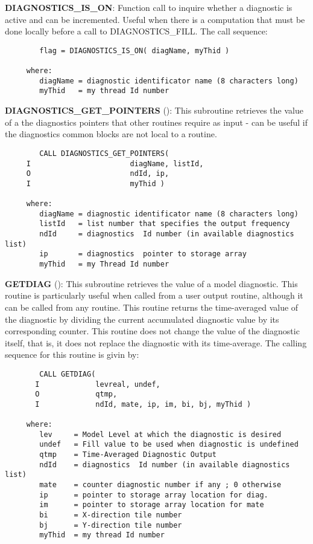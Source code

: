 \noindent
{\bf DIAGNOSTICS\_IS\_ON}: Function call to inquire whether a
diagnostic is active and can be incremented. Useful when there is a
computation that must be done locally before a call to
DIAGNOSTICS\_FILL. The call sequence:

\begin{verbatim}
        flag = DIAGNOSTICS_IS_ON( diagName, myThid )

     where:
        diagName = diagnostic identificator name (8 characters long)
        myThid   = my thread Id number
\end{verbatim}

\noindent
{\bf DIAGNOSTICS\_GET\_POINTERS}
():
This subroutine retrieves the value of a the diagnostics pointers 
that other routines require as input - can be useful if the diagnostics common 
blocks are not local to a routine.

\begin{verbatim}
        CALL DIAGNOSTICS_GET_POINTERS(
     I                       diagName, listId,
     O                       ndId, ip,
     I                       myThid )

     where:
        diagName = diagnostic identificator name (8 characters long)
        listId   = list number that specifies the output frequency
        ndId     = diagnostics  Id number (in available diagnostics list)
        ip       = diagnostics  pointer to storage array
        myThid   = my Thread Id number
\end{verbatim}

\noindent
{\bf GETDIAG} 
():
This subroutine retrieves the value of a model diagnostic.  
This routine is particularly useful when called from a
user output routine, although it can be called from any routine.  This
routine returns the time-averaged value of the diagnostic by dividing
the current accumulated diagnostic value by its corresponding counter.
This routine does not change the value of the diagnostic itself, that
is, it does not replace the diagnostic with its time-average.  The
calling sequence for this routine is givin by:

\begin{verbatim}
        CALL GETDIAG(
       I             levreal, undef,
       O             qtmp,
       I             ndId, mate, ip, im, bi, bj, myThid )

     where:
        lev     = Model Level at which the diagnostic is desired
        undef   = Fill value to be used when diagnostic is undefined
        qtmp    = Time-Averaged Diagnostic Output
        ndId    = diagnostics  Id number (in available diagnostics list)
        mate    = counter diagnostic number if any ; 0 otherwise
        ip      = pointer to storage array location for diag.
        im      = pointer to storage array location for mate
        bi      = X-direction tile number
        bj      = Y-direction tile number
        myThid  = my thread Id number
\end{verbatim}

